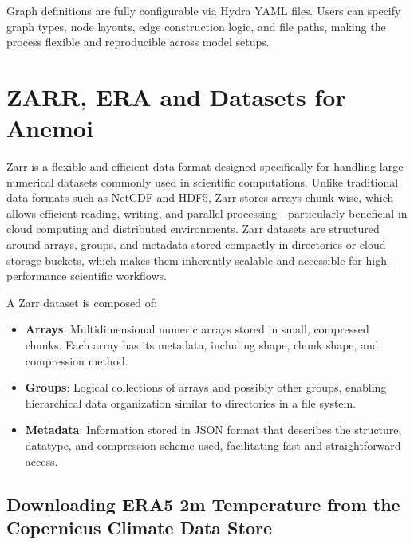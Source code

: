 Graph definitions are fully configurable via Hydra YAML files. Users can specify graph types, node layouts, edge construction logic, and file paths, making the process flexible and reproducible across model setups.



%
\section{ZARR, ERA and Datasets for Anemoi}

Zarr is a flexible and efficient data format designed specifically for handling large numerical datasets commonly used in scientific computations. Unlike traditional data formats such as NetCDF and HDF5, Zarr stores arrays chunk-wise, which allows efficient reading, writing, and parallel processing—particularly beneficial in cloud computing and distributed environments. Zarr datasets are structured around arrays, groups, and metadata stored compactly in directories or cloud storage buckets, which makes them inherently scalable and accessible for high-performance scientific workflows.

A Zarr dataset is composed of:

\begin{itemize}
\item \textbf{Arrays}: Multidimensional numeric arrays stored in small, compressed chunks. Each array has its metadata, including shape, chunk shape, and compression method.
\item \textbf{Groups}: Logical collections of arrays and possibly other groups, enabling hierarchical data organization similar to directories in a file system.
\item \textbf{Metadata}: Information stored in JSON format that describes the structure, datatype, and compression scheme used, facilitating fast and straightforward access.
\end{itemize}

%
\subsection{Downloading ERA5 2m Temperature from the Copernicus Climate Data Store}

